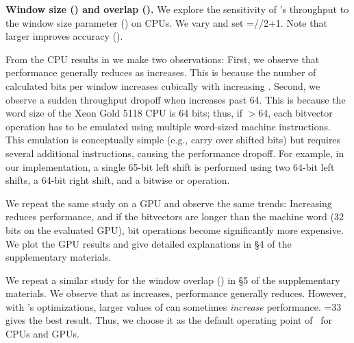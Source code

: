 \textbf{Window size () and overlap ().}
We explore the sensitivity of \toolname's throughput to the window size parameter  () on CPUs. We vary  and set =//2+1. Note that larger  improves accuracy ().

From the CPU results in  we make two observations: First, we observe that performance generally reduces as  increases. This is because the number of calculated bits per window increases cubically with increasing . Second, we observe a sudden throughput dropoff when  increases past 64. This is because the word size of the Xeon Gold 5118 CPU is 64 bits; thus, if $>$64, each bitvector operation has to be emulated using multiple word-sized machine instructions. This emulation is conceptually simple (e.g., carry over shifted bits) but requires several additional instructions, causing the performance dropoff.
For example, in our implementation, a single 65-bit left shift is performed using two 64-bit left shifts, a 64-bit right shift, and a bitwise or operation.

We repeat the same study on a GPU and observe the same trends: Increasing  reduces performance, and if the bitvectors are longer than the machine word (32 bits on the evaluated GPU), bit operations become significantly more expensive. We plot the GPU results and give detailed explanations in \S4 of the supplementary materials.

We repeat a similar study for the window overlap () in \S5 of the supplementary materials. We observe that as  increases, performance generally reduces. However, with \toolname's optimizations, larger values of  can sometimes \emph{increase} performance. =33 gives the best result. Thus, we choose it as the default operating point of \toolname\ for CPUs and GPUs.











